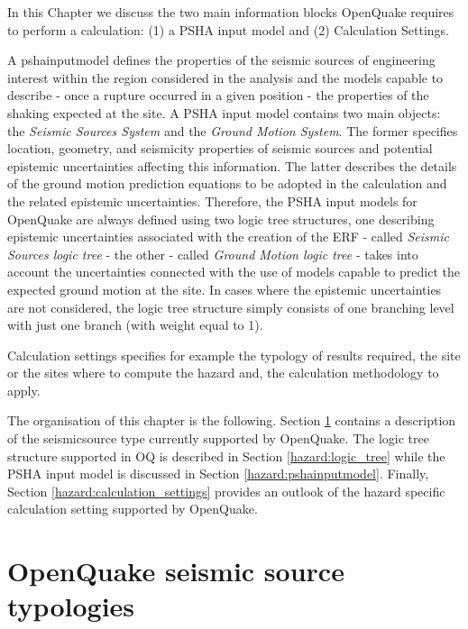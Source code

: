 %
%
In this Chapter we discuss the two main information blocks OpenQuake 
requires to perform a calculation: (1) a PSHA input model and (2) 
Calculation Settings.

A \gls{pshainputmodel} defines the properties of the seismic sources 
of engineering  interest within the region considered in the analysis and the 
models capable to describe - once a rupture occurred in a given position - the 
properties of the shaking expected at the site. 
%
A PSHA input model contains two main objects: the \emph{Seismic Sources System} 
and the \emph{Ground Motion System}. 
%
The former specifies location, geometry, and seismicity properties of seismic 
sources and potential epistemic uncertainties affecting this information. 
%
The latter describes the details of the ground motion prediction equations to 
be adopted in the calculation and the related epistemic uncertainties. 
%
Therefore, the PSHA input models for OpenQuake are always defined using two 
logic tree structures, one describing epistemic uncertainties associated 
with the creation of the ERF - called \emph{Seismic Sources logic tree} - 
the other - called \emph{Ground Motion logic tree} - takes into account 
the uncertainties connected with the use of models capable to predict the 
expected ground motion at the site. 
%
In cases where the epistemic uncertainties are not considered, the logic tree 
structure simply consists of one branching level with just one branch (with 
weight equal to 1).

Calculation settings specifies for example the typology of results required,
the site or the sites where to compute the hazard and, the calculation
methodology to apply.

The organisation of this chapter is the following.  
Section \ref{hazard:seismic_source_types} contains a description of the 
seismicsource type currently supported by OpenQuake. 
The logic tree structure supported in OQ is described in Section 
\ref{hazard:logic_tree} while the PSHA input model is discussed in 
Section \ref{hazard:pshainputmodel}.
Finally, Section \ref{hazard:calculation_settings} provides an outlook 
of the hazard specific calculation setting supported by OpenQuake.
%
\section[OpenQuake seismic source typologies]{OpenQuake seismic source 
typologies}
\label{hazard:seismic_source_types}

%
